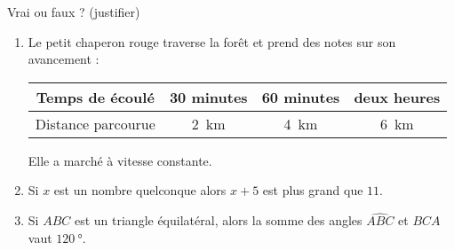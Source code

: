 
\begin{exercice}\label{exo2smath-0251}

    Vrai ou faux ? (justifier)
    \begin{enumerate}
        \item
            Le petit chaperon rouge traverse la forêt et prend des notes sur son avancement :
            \begin{center}
                \begin{tabular}[]{|c||c|c|c|}
                    \hline
                    Temps de écoulé&30 minutes&60 minutes&deux heures\\
                    \hline
                    Distance parcourue&\SI{2}{\kilo\meter}&\SI{4}{\kilo\meter}&\SI{6}{\kilo\meter}\\ 
                    \hline
                \end{tabular}
            \end{center}
            Elle a marché à vitesse constante.
        \item
            Si \( x\) est un nombre quelconque alors \( x+5\) est plus grand que \( 11\).
        \item
            Si \( ABC\) est un triangle équilatéral, alors la somme des angles \( \widehat{ABC}\) et \( \widehat{BCA}\) vaut \(\SI{120}{\degree}\).
    \end{enumerate}

\end{exercice}
